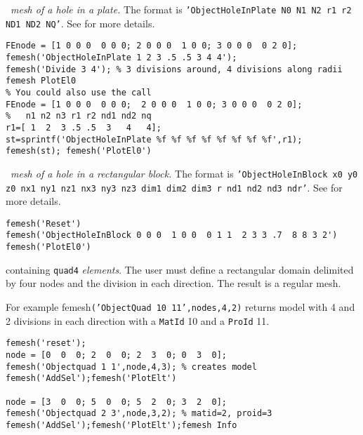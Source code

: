  \quada\ {\sl mesh of a hole in a plate.} The format is {\tt 'ObjectHoleInPlate {\ti N0 N1 N2 r1 r2 ND1 ND2 NQ}'}. See  for more details.

\begin{verbatim}
FEnode = [1 0 0 0  0 0 0; 2 0 0 0  1 0 0; 3 0 0 0  0 2 0];
femesh('ObjectHoleInPlate 1 2 3 .5 .5 3 4 4');
femesh('Divide 3 4'); % 3 divisions around, 4 divisions along radii
femesh PlotEl0
% You could also use the call
FEnode = [1 0 0 0  0 0 0;  2 0 0 0  1 0 0; 3 0 0 0  0 2 0];
%   n1 n2 n3 r1 r2 nd1 nd2 nq
r1=[ 1  2  3 .5 .5  3   4   4];
st=sprintf('ObjectHoleInPlate %f %f %f %f %f %f %f %f',r1);
femesh(st); femesh('PlotEl0')
\end{verbatim}%



 \hexah\ {\sl mesh of a hole in a rectangular block.} The format is {\tt 'ObjectHoleInBlock {\ti x0 y0 z0  nx1 ny1 nz1  nx3 ny3 nz3 dim1 dim2 dim3 r nd1 nd2 nd3 ndr}'}. See  for more details.

\begin{verbatim}
femesh('Reset')
femesh('ObjectHoleInBlock 0 0 0  1 0 0  0 1 1  2 3 3 .7  8 8 3 2')
femesh('PlotEl0') 
\end{verbatim}%


 containing {\tt quad4} {\sl elements}. The user must define a rectangular domain delimited by four nodes and the division in each direction. The result is a regular mesh. 

For example femesh{\tt ('ObjectQuad 10 11',nodes,4,2)} returns model with 4 and 2 divisions in each direction with a {\tt MatId} 10 and a {\tt ProId} 11.

\begin{verbatim}
femesh('reset');
node = [0  0  0; 2  0  0; 2  3  0; 0  3  0];
femesh('Objectquad 1 1',node,4,3); % creates model 
femesh('AddSel');femesh('PlotElt')

node = [3  0  0; 5  0  0; 5  2  0; 3  2  0];
femesh('Objectquad 2 3',node,3,2); % matid=2, proid=3
femesh('AddSel');femesh('PlotElt');femesh Info
\end{verbatim}%

